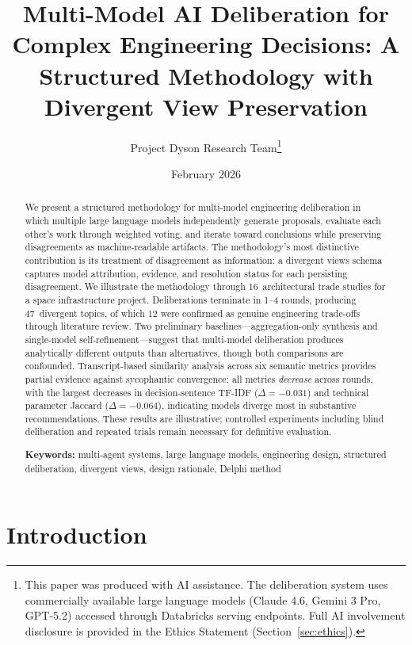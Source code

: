 \documentclass[11pt,a4paper]{article}
\title{\textbf{Multi-Model AI Deliberation for Complex Engineering Decisions: A Structured Methodology with Divergent View Preservation}}
\author{Project Dyson Research Team\thanks{This paper was produced with AI assistance. The deliberation system uses commercially available large language models (Claude 4.6, Gemini 3 Pro, GPT-5.2) accessed through Databricks serving endpoints. Full AI involvement disclosure is provided in the Ethics Statement (Section~\ref{sec:ethics}).}}
\affil{Project Dyson --- Open-Source Space Infrastructure Initiative\\ \texttt{https://projectdyson.org}}
\date{February 2026}
\begin{document}
\maketitle

\begin{abstract}
We present a structured methodology for multi-model engineering deliberation in which multiple large language models independently generate proposals, evaluate each other's work through weighted voting, and iterate toward conclusions while preserving disagreements as machine-readable artifacts. The methodology's most distinctive contribution is its treatment of disagreement as information: a divergent views schema captures model attribution, evidence, and resolution status for each persisting disagreement. We illustrate the methodology through 16~architectural trade studies for a space infrastructure project. Deliberations terminate in 1--4 rounds, producing 47~divergent topics, of which 12 were confirmed as genuine engineering trade-offs through literature review. Two preliminary baselines---aggregation-only synthesis and single-model self-refinement---suggest that multi-model deliberation produces analytically different outputs than alternatives, though both comparisons are confounded. Transcript-based similarity analysis across six semantic metrics provides partial evidence against sycophantic convergence: all metrics \emph{decrease} across rounds, with the largest decreases in decision-sentence TF-IDF ($\Delta = -0.031$) and technical parameter Jaccard ($\Delta = -0.064$), indicating models diverge most in substantive recommendations. These results are illustrative; controlled experiments including blind deliberation and repeated trials remain necessary for definitive evaluation.

\medskip
\noindent\textbf{Keywords:} multi-agent systems, large language models, engineering design, structured deliberation, divergent views, design rationale, Delphi method
\end{abstract}

\onehalfspacing

\section{Introduction}
\label{sec:introduction}
\end{document}

